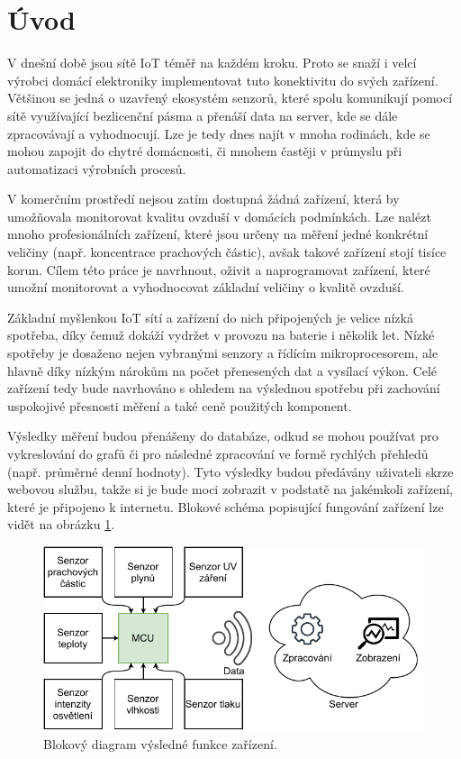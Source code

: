 \chapter*{Úvod}
{}

V dnešní době jsou sítě IoT téměř na každém kroku. Proto se snaží i velcí výrobci domácí elektroniky implementovat tuto konektivitu do svých zařízení. Většinou se jedná o uzavřený ekosystém senzorů, které spolu komunikují pomocí sítě využívající bezlicenční pásma a přenáší data na server, kde se dále zpracovávají a vyhodnocují. Lze je tedy dnes najít v mnoha rodinách, kde se mohou zapojit do chytré domácnosti, či mnohem častěji v průmyslu při automatizaci výrobních procesů.

V komerčním prostředí nejsou zatím dostupná žádná zařízení, která by umožňovala monitorovat kvalitu ovzduší v domácích podmínkách. Lze nalézt mnoho profesionálních zařízení, které jsou určeny na měření jedné konkrétní veličiny (např. koncentrace prachových částic), avšak takové zařízení stojí tisíce korun. Cílem této práce je navrhnout, oživit a naprogramovat zařízení, které umožní monitorovat a vyhodnocovat základní veličiny o kvalitě ovzduší.

Základní myšlenkou IoT sítí a zařízení do nich připojených je velice nízká spotřeba, díky čemuž dokáží vydržet v provozu na baterie i několik let. Nízké spotřeby je dosaženo nejen vybranými senzory a řídícím mikroprocesorem, ale hlavně díky nízkým nárokům na počet přenesených dat a vysílací výkon. Celé zařízení tedy bude navrhováno s ohledem na výslednou spotřebu při zachování uspokojivé přesnosti měření a také ceně použitých komponent.

Výsledky měření budou přenášeny do databáze, odkud se mohou používat pro vykreslování do grafů či pro následné zpracování ve formě rychlých přehledů (např. průměrné denní hodnoty). Tyto výsledky budou předávány uživateli skrze webovou službu, takže si je bude moci zobrazit v podstatě na jakémkoli zařízení, které je připojeno k internetu. Blokové schéma popisující fungování zařízení lze vidět na obrázku \ref{fig_BlockDiagram-blank}.

\begin{figure}[h]
    \centering
    \includegraphics{obrazky/block_schematic-blank.drawio.pdf}
    \caption{Blokový diagram výsledné funkce zařízení.}
    \label{fig_BlockDiagram-blank}
\end{figure}
